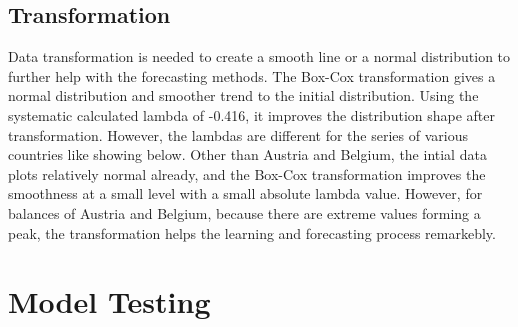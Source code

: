 \documentclass[12pt]{article}
\begin{document}
\subsection{Transformation }
Data transformation is needed to create a smooth line or a normal distribution to further help with the forecasting methods. The Box-Cox transformation gives a normal distribution and smoother trend to the initial distribution. Using the systematic calculated lambda of -0.416, it improves the distribution shape after transformation. However, the lambdas are different for the series of various countries like showing below. Other than Austria and Belgium, the intial data plots relatively normal already, and the Box-Cox transformation improves the smoothness at a small level with a small absolute lambda value. However, for balances of Austria and Belgium, because there are extreme values forming a peak, the transformation helps the learning and forecasting process remarkebly. 
\begin{table}[!htbp] \centering 
  \caption{Box-Cox Transformation Lambda} 
  \label{} 
\end{table} 

\section{Model Testing}
\end{document}

